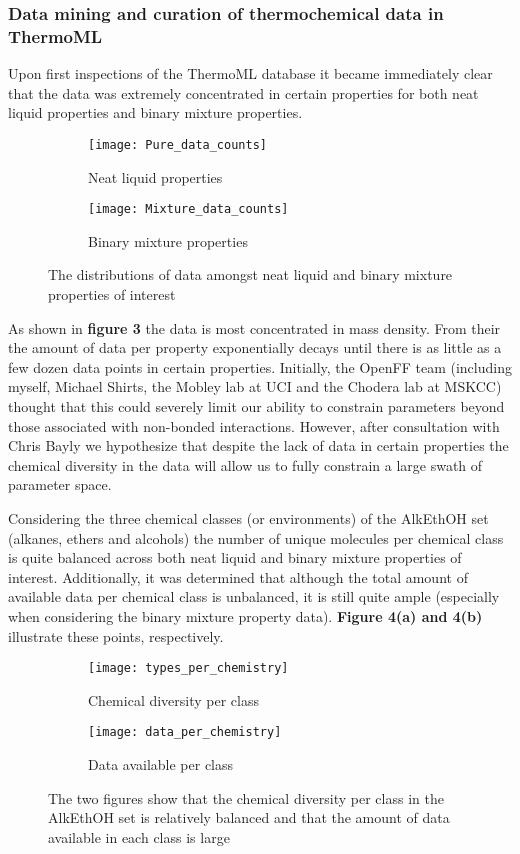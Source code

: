 \documentclass[rmp,nofootinbib,superscriptaddress,12pt,tightenlines,notitlepage]{revtex4-1}
\begin{document}
\subsubsection{Data mining and curation of thermochemical data in ThermoML}
Upon first inspections of the ThermoML database it became immediately clear that the data was extremely concentrated in certain properties for both 
neat liquid properties and binary mixture properties. 
\begin{figure}[h!]
\centering
\begin{subfigure}{.5\textwidth}
  \centering
  \texttt{[image: Pure\_data\_counts]}
  \caption{Neat liquid properties}
  \label{fig:sub1}
\end{subfigure}%
\begin{subfigure}{.5\textwidth}
  \centering
  \texttt{[image: Mixture\_data\_counts]}
  \caption{Binary mixture properties}
  \label{fig:sub2}
\end{subfigure}
\caption{The distributions of data amongst neat liquid and binary mixture properties of interest}
\label{fig:test}
\end{figure}
As shown in \textbf{figure 3} the data is most concentrated in mass density. From their the amount of data per property exponentially decays
until there is as little as a few dozen data points in certain properties. Initially, the OpenFF team (including myself, Michael Shirts, the 
Mobley lab at UCI and the Chodera lab at MSKCC) thought that this could severely limit our ability to constrain parameters beyond those 
associated with non-bonded interactions. However, after consultation with Chris Bayly we hypothesize that despite the lack of data in certain properties
the chemical diversity in the data will allow us to fully constrain a large swath of parameter space.

Considering the three chemical classes (or environments) of the AlkEthOH set (alkanes, ethers and alcohols) the number of unique molecules per chemical class is quite balanced 
across both neat liquid and binary mixture properties of interest. Additionally, it was determined that although the total amount of available data per chemical class is unbalanced, it is still quite ample (especially when considering the binary mixture property data). \textbf{Figure 4(a) and 4(b)} illustrate these
points, respectively.
\begin{figure}[h!]
\centering
\begin{subfigure}{.5\textwidth}
  \centering
  \texttt{[image: types\_per\_chemistry]}
  \caption{Chemical diversity per class}
  \label{fig:sub1}
\end{subfigure}%
\begin{subfigure}{.5\textwidth}
  \centering
  \texttt{[image: data\_per\_chemistry]}
  \caption{Data available per class}
  \label{fig:sub2}
\end{subfigure}
\caption{The two figures show that the chemical diversity per class in the AlkEthOH set is relatively balanced and that the amount of data available in each class is large}
\label{fig:test}
\end{figure}
\end{document}

